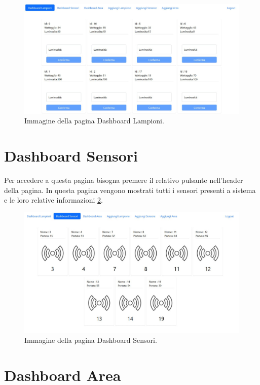 \begin{figure}[ht]
    \centering
    \includegraphics[width=\textwidth]{img/lista_lampioni.jpeg}
    \caption{Immagine della pagina Dashboard Lampioni.}
    \label{fig:lista_lampioni}
\end{figure}

\section{Dashboard Sensori}

Per accedere a questa pagina bisogna premere il relativo pulsante nell'header della pagina. In questa pagina vengono mostrati tutti i sensori presenti a sistema e le loro relative informazioni \ref{fig:lista_sensori}.

\begin{figure}[ht]
    \centering
    \includegraphics[width=\textwidth]{img/lista_sensori.jpeg}
    \caption{Immagine della pagina Dashboard Sensori.}
    \label{fig:lista_sensori}
\end{figure}

\section{Dashboard Area}

